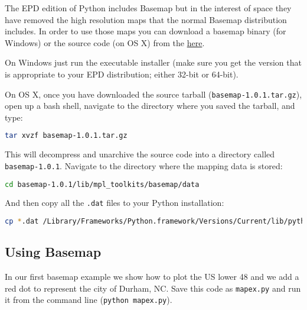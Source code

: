 The EPD edition of Python includes Basemap but in the interest of space
they have removed the high resolution maps that the normal Basemap
distribution includes. In order to use those maps you can download a
basemap binary (for Windows) or the source code (on OS X) from the
\href{http://sourceforge.net/projects/matplotlib/files/matplotlib-toolkits/basemap-1.0.1/}{here}.

On Windows just run the executable installer (make sure you get the
version that is appropriate to your EPD distribution; either 32-bit or
64-bit).

On OS X, once you have downloaded the source tarball
(\lstinline!basemap-1.0.1.tar.gz!), open up a bash shell, navigate to
the directory where you saved the tarball, and type:

\begin{lstlisting}[language=bash]
tar xvzf basemap-1.0.1.tar.gz
\end{lstlisting}
This will decompress and unarchive the source code into a directory
called \lstinline!basemap-1.0.1!. Navigate to the directory where the
mapping data is stored:

\begin{lstlisting}[language=bash]
cd basemap-1.0.1/lib/mpl_toolkits/basemap/data
\end{lstlisting}
And then copy all the \lstinline!.dat! files to your Python
installation:

\begin{lstlisting}[language=bash]
cp *.dat /Library/Frameworks/Python.framework/Versions/Current/lib/python2.7/site-packages/mpl_toolkits/basemap/data
\end{lstlisting}
\subsection{Using Basemap}

In our first basemap example we show how to plot the US lower 48 and we
add a red dot to represent the city of Durham, NC. Save this code as
\lstinline!mapex.py! and run it from the command line
(\lstinline!python mapex.py!).


